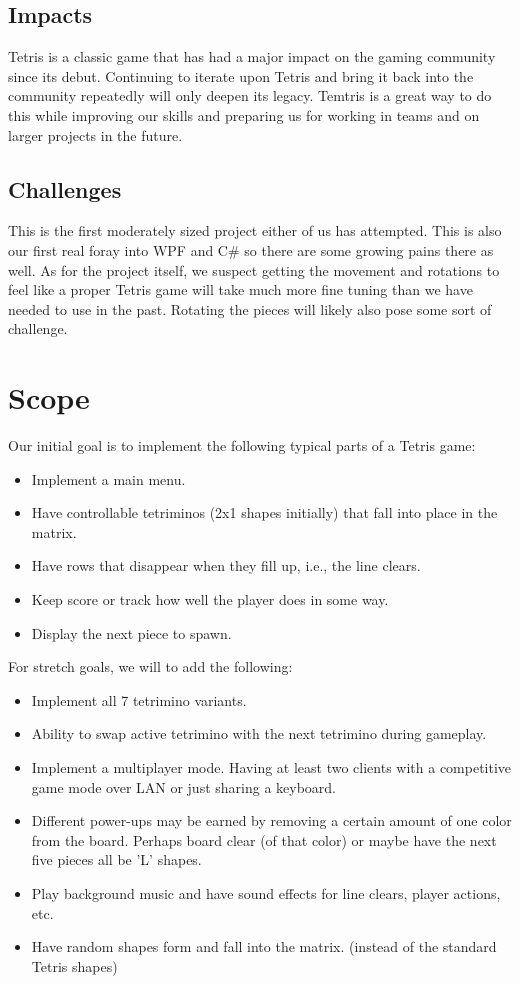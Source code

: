 \documentclass[10pt,conference,onecolumn,compsoc]{IEEEtran}
\begin{document}
\subsection{Impacts}
Tetris is a classic game that has had a major impact on the gaming community since its debut. Continuing to iterate upon Tetris and bring it back into the community repeatedly will only deepen its legacy. Temtris is a great way to  do this while improving our skills and preparing us for working in teams and on larger projects in the future.

\subsection{Challenges}
This is the first moderately sized project either of us has attempted. This is also our first real foray into WPF and C\# so there are some growing pains there as well. As for the project itself, we suspect getting the movement and rotations to feel like a proper Tetris game will take much more fine tuning than we have needed to use in the past. Rotating the pieces will likely also pose some sort of challenge.

\section{Scope}
Our initial goal is to implement the following typical parts of a Tetris game: 
\begin{itemize}
\item Implement a main menu.
\item Have controllable tetriminos (2x1 shapes initially) that fall into place in the matrix. 
\item Have rows that disappear when they fill up, i.e., the line clears.
\item Keep score or track how well the player does in some way.
\item Display the next piece to spawn.
\end{itemize}

For stretch goals, we will to add the following:
\begin{itemize}
\item Implement all 7 tetrimino variants.
\item Ability to swap active tetrimino with the next tetrimino during gameplay.
\item Implement a multiplayer mode. Having at least two clients with a competitive game mode over LAN or just sharing a keyboard.
\item Different power-ups may be earned by removing a certain amount of one color from the board. Perhaps board clear (of that color) or maybe have the next five pieces all be 'L' shapes.
\item Play background music and have sound effects for line clears, player actions, etc.
\item Have random shapes form and fall into the matrix. (instead of the standard Tetris shapes)
\end{itemize}
\end{document}
